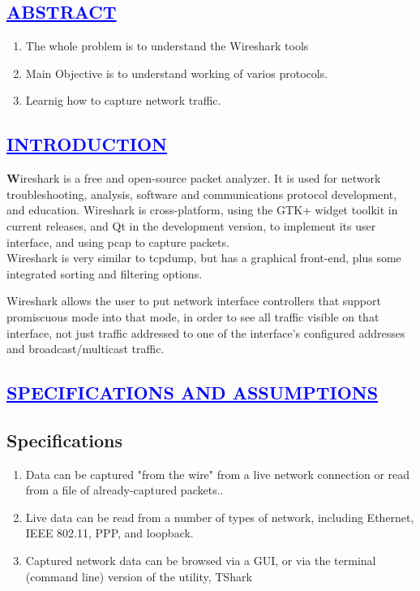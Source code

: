 \documentclass[a4paper,12pt]{report}
\begin{document}
\begin{center}
\chapter{\textcolor{blue}{\underline {ABSTRACT}}}
\end{center}
\begin{enumerate}
 


\item The whole problem is to understand the Wireshark tools  
\item Main Objective is to understand working of varios protocols. 
\item Learnig how to capture network traffic.

\end{enumerate}
\begin{center}
\chapter{\textcolor{blue}{\underline {INTRODUCTION}}}
\end{center}
\noindent \textbf Wireshark is a free and open-source packet analyzer. It is used for network troubleshooting, analysis, software and communications protocol development, and education.
Wireshark is cross-platform, using the GTK+ widget toolkit in current releases, and Qt in the development version, to implement its user interface, and using pcap to capture packets.\\

Wireshark is very similar to tcpdump, but has a graphical front-end, plus some integrated sorting and filtering options.

Wireshark allows the user to put network interface controllers that support promiscuous mode into that mode, in order to see all traffic visible on that interface, not just traffic addressed to one of the interface's configured addresses and broadcast/multicast traffic.
\begin{center}
\chapter{\textcolor{blue}{\underline {SPECIFICATIONS AND ASSUMPTIONS}}}
\end{center}
\section*{Specifications}
\begin{enumerate}
 
\item Data can be captured "from the wire" from a live network connection or read from a file of already-captured packets..
\item Live data can be read from a number of types of network, including Ethernet, IEEE 802.11, PPP, and loopback.

\item Captured network data can be browsed via a GUI, or via the terminal (command line) version of the utility, TShark


\end{enumerate}
\end{document}

